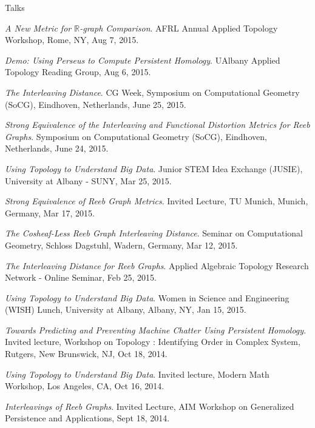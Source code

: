 \documentclass{resume} %
\begin{document}
\begin{rSection}{Talks}
\begin{etaremune}
\item\emph{A New Metric for $\mathbb{R}$-graph Comparison}. AFRL Annual Applied Topology Workshop, Rome, NY, Aug 7, 2015. 

\item\emph{Demo: Using Perseus to Compute Persistent Homology}. UAlbany Applied Topology Reading Group, Aug 6, 2015. 

\item\emph{The Interleaving Distance}. CG Week, Symposium on Computational Geometry (SoCG), Eindhoven, Netherlands, June 25, 2015. 

\item\emph{Strong Equivalence of the Interleaving and Functional Distortion Metrics for Reeb Graphs}. Symposium on Computational Geometry (SoCG), Eindhoven, Netherlands, June 24, 2015. 

\item\emph{Using Topology to Understand Big Data}. Junior STEM Idea Exchange (JUSIE), University at Albany - SUNY, Mar 25, 2015. 

\item\emph{Strong Equivalence of Reeb Graph Metrics}. Invited Lecture, TU Munich, Munich, Germany, Mar 17, 2015. 

\item\emph{The Cosheaf-Less Reeb Graph Interleaving Distance}. Seminar on Computational Geometry, Schloss Dagstuhl, Wadern, Germany, Mar 12, 2015. 

\item\emph{The Interleaving Distance for Reeb Graphs}. Applied Algebraic Topology Research Network - Online Seminar, Feb 25, 2015. 

\item\emph{Using Topology to Understand Big Data}. Women in Science and Engineering (WISH) Lunch, University at Albany, Albany, NY, Jan 15, 2015. 

\item\emph{Towards Predicting and Preventing Machine Chatter Using Persistent Homology}. Invited lecture, Workshop on Topology : Identifying Order in Complex System, Rutgers, New Brunswick, NJ, Oct 18, 2014. 

\item\emph{Using Topology to Understand Big Data}. Invited lecture, Modern Math Workshop, Los Angeles, CA, Oct 16, 2014. 

\item\emph{Interleavings of Reeb Graphs}. Invited Lecture, AIM Workshop on Generalized Persistence and Applications, Sept 18, 2014. 


\end{etaremune}
\end{rSection}
\end{document}

